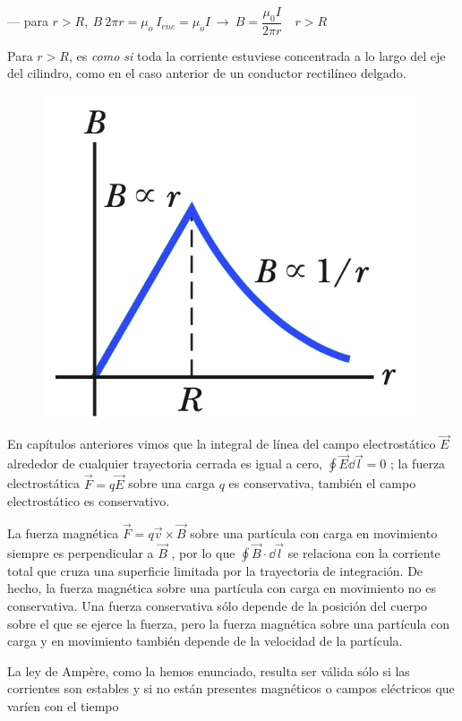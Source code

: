 \begin{multicols}{2}
--- para $r>R, \ B\ 2\pi r=\mu_o \ I_{enc}=\mu_o I \ \to \ B=\dfrac{\mu_0I}{2\pi r}\quad r>R$


Para $r>R$, es \emph{como si} toda la corriente estuviese concentrada a lo largo del eje del cilindro, como en el caso anterior de un conductor rectilíneo delgado. 
\begin{figure}[H]
	\centering
	\includegraphics[width=.35\textwidth]{imagenes/imagenes27/T27IM07.png}
\end{figure}	
\end{multicols}

En capítulos anteriores vimos que la integral de línea del campo electrostático $\vec E$ alrededor de cualquier trayectoria cerrada es igual a cero, $\oint \vec E \dd \vec l =0$ ;  la fuerza electrostática  $\vec F = q \vec E$ sobre una carga $q$ es conservativa, también el campo electrostático es conservativo.

La fuerza magnética  $\vec F = q \vec v \times \vec  B$  sobre una partícula con carga en movimiento siempre es perpendicular a $\vec B$ , por lo que $\oint \vec B \cdot \dd \vec l$  se relaciona con la corriente total que cruza una superficie limitada por la trayectoria de integración. De hecho, la fuerza magnética sobre una partícula con carga en movimiento no es conservativa.  Una fuerza conservativa sólo depende de la posición del cuerpo sobre el que se ejerce la fuerza, pero la fuerza magnética sobre una partícula con carga y en movimiento también depende de la velocidad de la partícula. 

La ley de Ampère, como la hemos enunciado, resulta ser válida sólo si las corrientes son estables y si no están presentes magnéticos o campos eléctricos que varíen con el tiempo 

